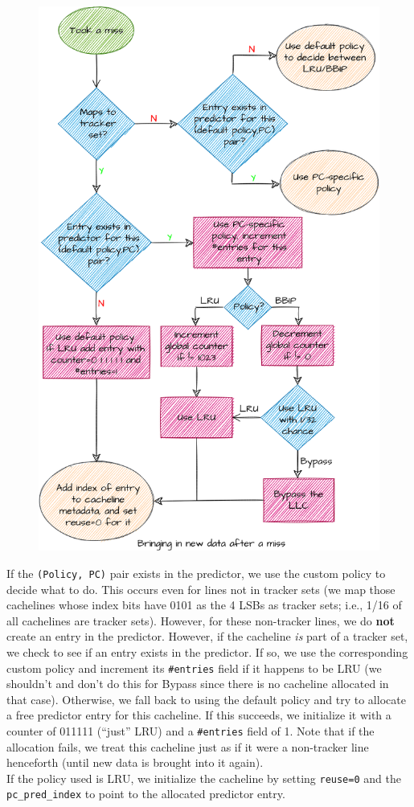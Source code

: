 \documentclass[11pt, swedish, openany]{book}
\begin{document}
\begin{figure}[H]
    \centering
    \includegraphics[width=0.6\linewidth]{images/newcacheline.png}
\end{figure}
If the \texttt{(Policy, PC)} pair exists in the predictor, we use the custom policy to decide what to do. This occurs even for lines not in tracker sets (we map those cachelines whose index bits have 0101 as the 4 LSBs as tracker sets; i.e., 1/16 of all cachelines are tracker sets). However, for these non-tracker lines, we do \textbf{not} create an entry in the predictor. However, if the cacheline \textit{is} part of a tracker set, we check to see if an entry exists in the predictor. If so, we use the corresponding custom policy and increment its \texttt{\#entries} field if it happens to be LRU (we shouldn't and don't do this for Bypass since there is no cacheline allocated in that case). Otherwise, we fall back to using the default policy and try to allocate a free predictor entry for this cacheline. If this succeeds, we initialize it with a counter of 011111 (``just'' LRU) and a \texttt{\#entries} field of 1. Note that if the allocation fails, we treat this cacheline just as if it were a non-tracker line henceforth (until new data is brought into it again).\\
If the policy used is LRU, we initialize the cacheline by setting \texttt{reuse=0} and the \texttt{pc\_pred\_index} to point to the allocated predictor entry. \\
\end{document}
